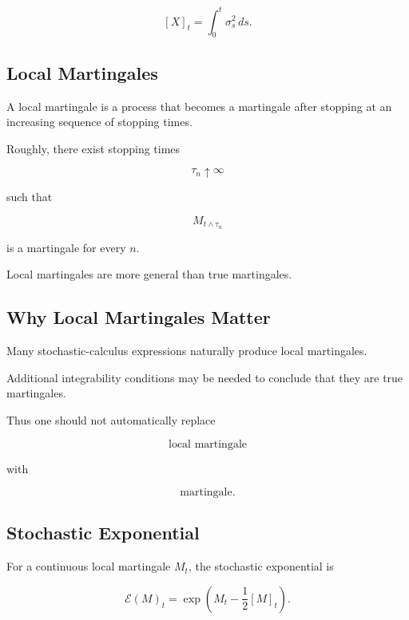 \[
\boxed{
[X]_t
=
\int_0^t
\sigma_s^2\,ds.
}
\]

\subsection{Local Martingales}
\label{subsec:local-martingales}

A local martingale is a process that becomes a martingale after
stopping at an increasing sequence of stopping times.

Roughly, there exist stopping times

\[
\tau_n\uparrow\infty
\]

such that

\[
\boxed{
M_{t\wedge\tau_n}
}
\]

is a martingale for every \(n\).

Local martingales are more general than true martingales.

\subsection{Why Local Martingales Matter}
\label{subsec:why-local-martingales}

Many stochastic-calculus expressions naturally produce local
martingales.

Additional integrability conditions may be needed to conclude that they
are true martingales.

Thus one should not automatically replace

\[
\boxed{
\text{local martingale}
}
\]

with

\[
\boxed{
\text{martingale}.
}
\]

\subsection{Stochastic Exponential}
\label{subsec:stochastic-exponential}

For a continuous local martingale \(M_t\), the stochastic exponential is

\[
\boxed{
\mathcal{E}(M)_t
=
\exp
\left(
M_t
-
\frac12[M]_t
\right).
}
\]

